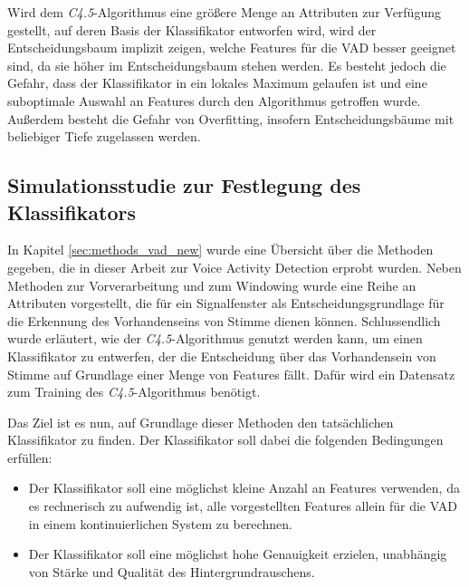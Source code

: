 Wird dem \emph{C4.5}-Algorithmus eine größere Menge an Attributen zur Verfügung gestellt, auf deren Basis der Klassifikator entworfen wird, wird der Entscheidungsbaum implizit zeigen, welche Features für die VAD besser geeignet sind, da sie höher im Entscheidungsbaum stehen werden. Es besteht jedoch die Gefahr, dass der Klassifikator in ein lokales Maximum gelaufen ist und eine suboptimale Auswahl an Features durch den Algorithmus getroffen wurde. Außerdem besteht die Gefahr von Overfitting, insofern Entscheidungsbäume mit beliebiger Tiefe zugelassen werden.

\subsection{Simulationsstudie zur Festlegung des Klassifikators}
\label{sec:vad_study}

In Kapitel \ref{sec:methods_vad_new} wurde eine Übersicht über die Methoden gegeben, die in dieser Arbeit zur Voice Activity Detection erprobt wurden. Neben Methoden zur Vorverarbeitung und zum Windowing wurde eine Reihe an Attributen vorgestellt, die für ein Signalfenster als Entscheidungsgrundlage für die Erkennung des Vorhandenseins von Stimme dienen können. Schlussendlich wurde erläutert, wie der \emph{C4.5}-Algorithmus genutzt werden kann, um einen Klassifikator zu entwerfen, der die Entscheidung über das Vorhandensein von Stimme auf Grundlage einer Menge von Features fällt. Dafür wird ein Datensatz zum Training des \emph{C4.5}-Algorithmus benötigt.

Das Ziel ist es nun, auf Grundlage dieser Methoden den tatsächlichen Klassifikator zu finden. Der Klassifikator soll dabei die folgenden Bedingungen erfüllen:

\begin{itemize}
\item Der Klassifikator soll eine möglichst kleine Anzahl an Features verwenden, da es rechnerisch zu aufwendig ist, alle vorgestellten Features allein für die VAD in einem kontinuierlichen System zu berechnen.
\item Der Klassifikator soll eine möglichst hohe Genauigkeit erzielen, unabhängig von Stärke und Qualität des Hintergrundrauschens.
\end{itemize}

